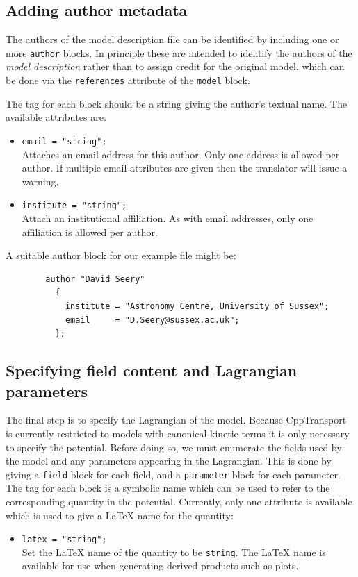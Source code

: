 \documentclass[11pt,a4paper]{article}
\newenvironment{example}{\begin{tcolorbox}[enhanced,breakable,colback=black!10,colbacktitle=black!20,colframe=black!40,coltitle=black,title=Example,fonttitle=\sffamily\fontseries{b}\selectfont]}{\end{tcolorbox}}
\newcommand{\packagefont}{\sffamily}
\newcommand{\CppTransport}{{\packagefont CppTransport}}
\newcommand{\block}[1]{\texttt{#1}}
\newcommand{\attribute}[1]{\texttt{#1}}
\begin{document}
\subsection{Adding author metadata}
\label{sec:author-block}
The authors of the model description file can be
identified by including one or more \block{author}
blocks.
In principle these are intended to identify the authors
of the \emph{model description} rather than to assign
credit for the original model,
which can be done via the
\attribute{references} attribute
of the \block{model} block.

The tag for each block should be a string giving the
author's textual name.
The available attributes are:
\begin{itemize}
    \item \attribute{email = "string";} \\
    Attaches an email address for this author. Only one
    address is allowed per author.
    If multiple email attributes are given then the
    translator will issue a warning.
    
    \item \attribute{institute = "string";} \\
    Attach an institutional affiliation.
    As with email addresses, only one affiliation
    is allowed per author.
\end{itemize}

\begin{example}
    A suitable author block for our example file might be:
    \begin{verbatim}
        author "David Seery"
          {
            institute = "Astronomy Centre, University of Sussex";
            email     = "D.Seery@sussex.ac.uk";
          };    
    \end{verbatim}
\end{example}

\subsection{Specifying field content and Lagrangian parameters}
\label{sec:field-param-block}
The final step is to specify the Lagrangian of the model.
Because {\CppTransport} is currently restricted to models with
canonical kinetic terms it is only necessary to specify the potential.
Before doing so, we must enumerate the fields used by the model
and any parameters appearing in the Lagrangian.
This is done by giving
a \block{field} block for each field, and a \block{parameter} block
for each parameter.
The tag for each block is a symbolic name which can be used to refer
to the corresponding quantity in the potential.
Currently, only one attribute is available which is used to give
a {\LaTeX} name for the quantity:
\begin{itemize}
    \item \attribute{latex = "string";} \\
    Set the {\LaTeX} name of the quantity to be
    \attribute{string}.
    The {\LaTeX} name is available for use when generating derived
    products such as plots.    
\end{itemize}
\end{document}
